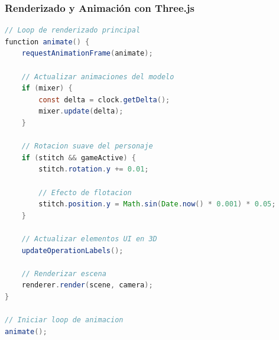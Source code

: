 \documentclass{beamer}
\begin{document}
\begin{frame}[fragile]
\frametitle{Renderizado y Animación con Three.js}
\begin{lstlisting}[language=Java, basicstyle=\tiny]
// Loop de renderizado principal
function animate() {
    requestAnimationFrame(animate);
    
    // Actualizar animaciones del modelo
    if (mixer) {
        const delta = clock.getDelta();
        mixer.update(delta);
    }
    
    // Rotacion suave del personaje
    if (stitch && gameActive) {
        stitch.rotation.y += 0.01;
        
        // Efecto de flotacion
        stitch.position.y = Math.sin(Date.now() * 0.001) * 0.05;
    }
    
    // Actualizar elementos UI en 3D
    updateOperationLabels();
    
    // Renderizar escena
    renderer.render(scene, camera);
}

// Iniciar loop de animacion
animate();
\end{lstlisting}
\end{frame}
\end{document}
